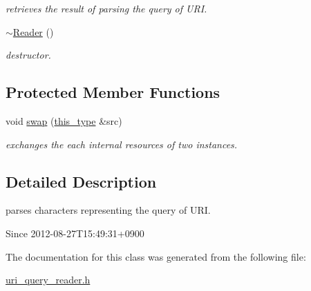 \begin{DoxyCompactItemize}
\begin{DoxyCompactList}\small\item\em retrieves the result of parsing the query of U\-R\-I. \end{DoxyCompactList}\item 
\hypertarget{classhryky_1_1uri_1_1query_1_1_reader_a3b60d06d3d06df6500ae57c030c69b92}{\hyperlink{classhryky_1_1uri_1_1query_1_1_reader_a3b60d06d3d06df6500ae57c030c69b92}{$\sim$\-Reader} ()}\label{classhryky_1_1uri_1_1query_1_1_reader_a3b60d06d3d06df6500ae57c030c69b92}

\begin{DoxyCompactList}\small\item\em destructor. \end{DoxyCompactList}\end{DoxyCompactItemize}
\subsection*{Protected Member Functions}
\begin{DoxyCompactItemize}
\item 
\hypertarget{classhryky_1_1uri_1_1query_1_1_reader_af05f276a250e39cfa7c39a00a5f4d25f}{void \hyperlink{classhryky_1_1uri_1_1query_1_1_reader_af05f276a250e39cfa7c39a00a5f4d25f}{swap} (\hyperlink{classhryky_1_1uri_1_1query_1_1_reader_a97e540246025546fe1c7f4570b3f7240}{this\-\_\-type} \&src)}\label{classhryky_1_1uri_1_1query_1_1_reader_af05f276a250e39cfa7c39a00a5f4d25f}

\begin{DoxyCompactList}\small\item\em exchanges the each internal resources of two instances. \end{DoxyCompactList}\end{DoxyCompactItemize}


\subsection{Detailed Description}
parses characters representing the query of U\-R\-I. 

\begin{DoxySince}{Since}
2012-\/08-\/27\-T15\-:49\-:31+0900 
\end{DoxySince}


The documentation for this class was generated from the following file\-:\begin{DoxyCompactItemize}
\item 
\hyperlink{uri__query__reader_8h}{uri\-\_\-query\-\_\-reader.\-h}\end{DoxyCompactItemize}
